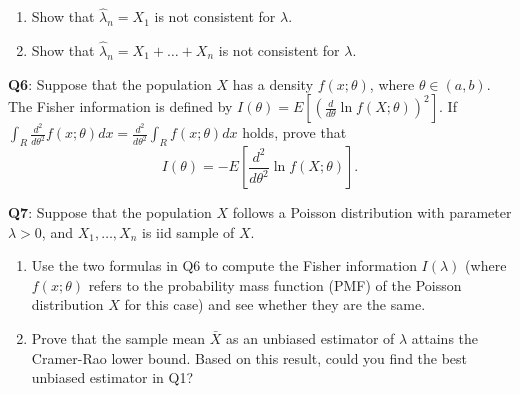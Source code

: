 \documentclass[]{article}
\begin{document}
\begin{enumerate}
\def\labelenumi{(\alph{enumi})}
\item
  Show that \(\hat\lambda_n=X_1\) is not consistent for \(\lambda\).
\item
  Show that \(\hat\lambda_n=X_1+\dots+X_n\) is not consistent for
  \(\lambda\).
\end{enumerate}

\textbf{Q6}: Suppose that the population \(X\) has a density
\(f(x;\theta)\), where \(\theta\in (a,b)\). The Fisher information is
defined by \(I(\theta) = E[(\frac{d}{d\theta}\ln f(X;\theta))^2]\). If
\(\int_R\frac{d^2}{d\theta^2} f(x;\theta)d x = \frac{d^2}{d\theta^2}\int_R f(x;\theta)d x\)
holds, prove that
\[I(\theta)= -E\left[\frac{d^2}{d\theta^2} \ln f(X;\theta)\right].\]

\textbf{Q7}: Suppose that the population \(X\) follows a Poisson
distribution with parameter \(\lambda>0\), and \(X_1,\dots, X_n\) is iid
sample of \(X\).

\begin{enumerate}
\def\labelenumi{\arabic{enumi}.}
\item
  Use the two formulas in Q6 to compute the Fisher information
  \(I(\lambda)\) (where \(f(x;\theta)\) refers to the probability mass
  function (PMF) of the Poisson distribution \(X\) for this case) and
  see whether they are the same.
\item
  Prove that the sample mean \(\bar X\) as an unbiased estimator of
  \(\lambda\) attains the Cramer-Rao lower bound. Based on this result,
  could you find the best unbiased estimator in Q1?
\end{enumerate}
\end{document}
